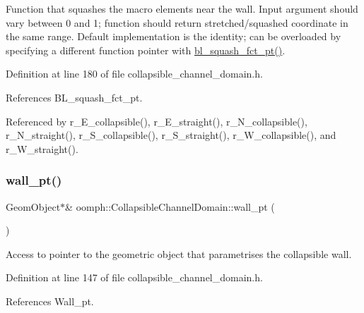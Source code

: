 Function that squashes the macro elements near the wall. Input argument should vary between 0 and 1; function should return stretched/squashed coordinate in the same range. Default implementation is the identity; can be overloaded by specifying a different function pointer with \hyperlink{classoomph_1_1CollapsibleChannelDomain_a9c7def97a2248a8e5a2dca79ee3a54eb}{bl\+\_\+squash\+\_\+fct\+\_\+pt()}. 



Definition at line 180 of file collapsible\+\_\+channel\+\_\+domain.\+h.



References B\+L\+\_\+squash\+\_\+fct\+\_\+pt.



Referenced by r\+\_\+\+E\+\_\+collapsible(), r\+\_\+\+E\+\_\+straight(), r\+\_\+\+N\+\_\+collapsible(), r\+\_\+\+N\+\_\+straight(), r\+\_\+\+S\+\_\+collapsible(), r\+\_\+\+S\+\_\+straight(), r\+\_\+\+W\+\_\+collapsible(), and r\+\_\+\+W\+\_\+straight().

\mbox{\label{classoomph_1_1CollapsibleChannelDomain_a0a98c02b478d61d2cd4c899d0d37344a}} 
\subsubsection{\texorpdfstring{wall\+\_\+pt()}{wall\_pt()}\hspace{0.1cm}{\footnotesize\ttfamily [1/2]}}
{\footnotesize\ttfamily Geom\+Object$\ast$\& oomph\+::\+Collapsible\+Channel\+Domain\+::wall\+\_\+pt (\begin{DoxyParamCaption}{ }\end{DoxyParamCaption})\hspace{0.3cm}{\ttfamily [inline]}}



Access to pointer to the geometric object that parametrises the collapsible wall. 



Definition at line 147 of file collapsible\+\_\+channel\+\_\+domain.\+h.



References Wall\+\_\+pt.




